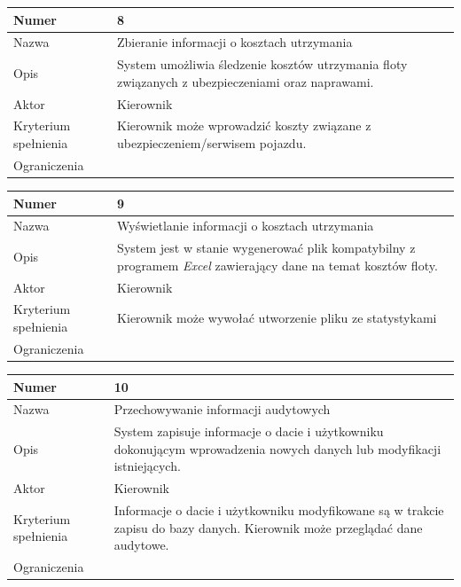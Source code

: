 \documentclass[eng,printmode,openany]{mgr}
\begin{document}
\begin{table}[H]
	\begin{tabularx}{\textwidth}{|l|X|}
		\hline
		Numer                & 8 \\ \hline
		Nazwa                & Zbieranie informacji o kosztach utrzymania \\ \hline
		Opis                 & System umożliwia śledzenie kosztów utrzymania floty związanych z ubezpieczeniami oraz naprawami. \\ \hline
		Aktor                & Kierownik \\ \hline
		Kryterium spełnienia & Kierownik może wprowadzić koszty związane z ubezpieczeniem/serwisem pojazdu. \\ \hline
		Ograniczenia         & \\ \hline
	\end{tabularx}
\end{table}

\begin{table}[H]
	\begin{tabularx}{\textwidth}{|l|X|}
		\hline
		Numer                & 9 \\ \hline
		Nazwa                & Wyświetlanie informacji o kosztach utrzymania \\ \hline
		Opis                 & System jest w stanie wygenerować plik kompatybilny z programem \textit{Excel} zawierający dane na temat kosztów floty. \\ \hline
		Aktor                & Kierownik \\ \hline
		Kryterium spełnienia & Kierownik może wywołać utworzenie pliku ze statystykami  \\ \hline
		Ograniczenia         & \\ \hline
	\end{tabularx}
\end{table}

\begin{table}[H]
	\begin{tabularx}{\textwidth}{|l|X|}
		\hline
		Numer                & 10 \\ \hline
		Nazwa                & Przechowywanie informacji audytowych \\ \hline
		Opis                 & System zapisuje informacje o dacie i użytkowniku dokonującym wprowadzenia nowych danych lub modyfikacji istniejących. \\ \hline
		Aktor                & Kierownik \\ \hline
		Kryterium spełnienia & Informacje o dacie i użytkowniku modyfikowane są w trakcie zapisu do bazy danych. Kierownik może przeglądać dane audytowe.  \\ \hline
		Ograniczenia         & \\ \hline
	\end{tabularx}
\end{table}
\end{document}

